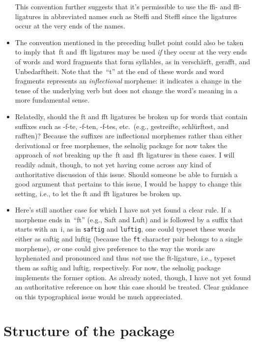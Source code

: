 \documentclass[11pt]{article}
\newcommand{\pkg}[1]{\textsf{#1}}
\newcommand{\opt}[1]{\texttt{#1}}
\begin{document}
\begin{itemize}
This convention further suggests that it's permissible to use the ffi- and ffl-ligatures in abbreviated names such as Steffi and Steffl since the ligatures occur at the very ends of the names. 

\item The convention mentioned in the preceding bullet point could also be taken to imply that~ft and~fft ligatures may be used {\itshape if} they occur at the very ends of words and word fragments that form syllables, as in verschärft, gerafft, and Unbedarftheit. Note that the~\enquote{t} at the end of these words and word fragments represents an \emph{inflectional} morpheme: it indicates a change in the tense of the underlying verb but does not change the word's meaning in a more fundamental sense.

\item Relatedly, should the ft and fft ligatures be broken up for words that contain suffixes such as -f-te, -f-ten, -f-tes, etc.\ (e.g., gestreifte, schlürftes\breaklig t, and rafften)? Because the suffixes are inflectional morphemes rather than either derivational or free morphemes, the \pkg{selnolig} package for now takes the approach of \emph{not} breaking up the~ft and~fft ligatures in these cases. I will readily admit, though, to not yet having come across any kind of authoritative discussion of this issue. Should someone be able to furnish a good argument that pertains to this issue, I would be happy to change this setting, i.e., to let the ft and fft ligatures be broken up.


\item Here's still another case for which I have not yet found a clear rule. If a morpheme ends in~\enquote{ft} (e.g., Saft and Luft) and is followed by a suffix that starts with an~i, as in \opt{saftig} and \opt{luftig}, one could typeset these words either as sa\mbox{ft}ig and lu\mbox{ft}ig (because the \opt{ft} character pair belongs to a single morpheme), \emph{or} one could give preference to the way the words are hyphenated and pronounced and thus \emph{not} use the ft-ligature, i.e., typeset them as saf\breaklig tig and luf\breaklig tig, respectively. For now, the \pkg{selnolig} package implements the former option. As already noted, though, I have not yet found an authoritative reference on how this case should be treated. Clear guidance on this typographical issue would be much appreciated.

\end{itemize}


\section{Structure of the package}
\end{document}

